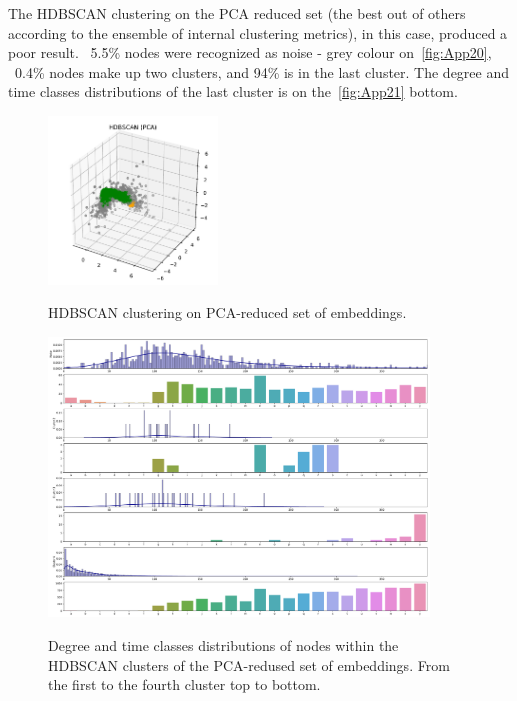 The HDBSCAN clustering on the PCA reduced set (the best out of others according to the ensemble of internal clustering metrics), in this case, produced a poor result. ~5.5\% nodes were recognized as noise - grey colour on~\autoref{fig:App20}, ~0.4\% nodes make up two clusters, and 94\% is in the last cluster. The degree and time classes distributions of the last cluster is on the~\autoref{fig:App21} bottom.

\begin{figure}[!ht]
	\centering
	\includegraphics[width=0.4\textwidth]{images/appendix/App20.pdf}\\
	\caption{HDBSCAN clustering on PCA-reduced set of embeddings.}
	\label{fig:App20}
\end{figure}
\begin{figure}[!ht]
	\centering
	\includegraphics[width=0.9\textwidth]{images/appendix/App21.pdf}\\
	\caption{Degree and time classes distributions of nodes within the HDBSCAN clusters of the PCA-redused set of embeddings. From the first to the fourth cluster top to bottom.}
	\label{fig:App21}
\end{figure}